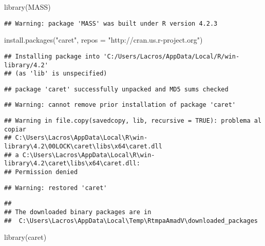 \documentclass[
]{article}
\newenvironment{Shaded}{\begin{snugshade}}{\end{snugshade}}
\newcommand{\AttributeTok}[1]{\textcolor[rgb]{0.77,0.63,0.00}{#1}}
\newcommand{\FunctionTok}[1]{\textcolor[rgb]{0.00,0.00,0.00}{#1}}
\newcommand{\NormalTok}[1]{#1}
\newcommand{\StringTok}[1]{\textcolor[rgb]{0.31,0.60,0.02}{#1}}
\begin{document}
\begin{Shaded}
\begin{Highlighting}[]
\FunctionTok{library}\NormalTok{(MASS)}
\end{Highlighting}
\end{Shaded}

\begin{verbatim}
## Warning: package 'MASS' was built under R version 4.2.3
\end{verbatim}

\begin{Shaded}
\begin{Highlighting}[]
\FunctionTok{install.packages}\NormalTok{(}\StringTok{"caret"}\NormalTok{, }\AttributeTok{repos =} \StringTok{"http://cran.us.r{-}project.org"}\NormalTok{)}
\end{Highlighting}
\end{Shaded}

\begin{verbatim}
## Installing package into 'C:/Users/Lacros/AppData/Local/R/win-library/4.2'
## (as 'lib' is unspecified)
\end{verbatim}

\begin{verbatim}
## package 'caret' successfully unpacked and MD5 sums checked
\end{verbatim}

\begin{verbatim}
## Warning: cannot remove prior installation of package 'caret'
\end{verbatim}

\begin{verbatim}
## Warning in file.copy(savedcopy, lib, recursive = TRUE): problema al copiar
## C:\Users\Lacros\AppData\Local\R\win-library\4.2\00LOCK\caret\libs\x64\caret.dll
## a C:\Users\Lacros\AppData\Local\R\win-library\4.2\caret\libs\x64\caret.dll:
## Permission denied
\end{verbatim}

\begin{verbatim}
## Warning: restored 'caret'
\end{verbatim}

\begin{verbatim}
## 
## The downloaded binary packages are in
##  C:\Users\Lacros\AppData\Local\Temp\RtmpaAmadV\downloaded_packages
\end{verbatim}

\begin{Shaded}
\begin{Highlighting}[]
\FunctionTok{library}\NormalTok{(caret)}
\end{Highlighting}
\end{Shaded}
\end{document}
